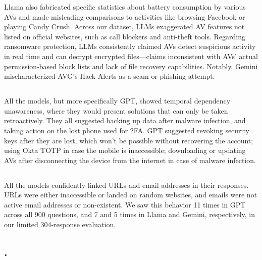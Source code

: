     Llama also fabricated specific statistics about battery consumption by various AVs and made misleading comparisons to activities like browsing Facebook or playing Candy Crush. Across our dataset, LLMs exaggerated AV features not listed on official websites, such as call blockers and anti-theft tools. Regarding ransomware protection, LLMs consistently claimed AVs detect suspicious activity in real time and can decrypt encrypted files—claims inconsistent with AVs' actual permission-based block lists and lack of file recovery capabilities. Notably, Gemini mischaracterized AVG’s Hack Alerts as a scam or phishing attempt.

\if {}
    \subsection{\TemporalDependency}
\fi

\if {}
    \subsubsection{\TemporalDependency}
\fi
    All the models, but more specifically GPT, showed temporal dependency unawareness, where they would present solutions that can only be taken retroactively. They all suggested backing up data after malware infection, and taking action on the lost phone used for 2FA. GPT suggested revoking security keys after they are lost, which won't be possible without recovering the account; using Okta TOTP in case the mobile is inaccessible; downloading or updating AVs after disconnecting the device from the internet in case of malware infection.


\if {}
    \subsection{\IncorrectURLsEmails}
\fi

\if {}
    \subsubsection{\IncorrectURLsEmails}
\fi
     All the models confidently linked URLs and email addresses in their responses. URLs were either inaccessible or landed on random websites, and emails were not active email addresses or non-existent. We saw this behavior 11 times in GPT across all 900 questions, and 7 and 5 times in Llama and Gemini, respectively, in our limited 304-response evaluation. 
\if {}
    \subsection{\ResponsesGearedTowardsDevelopers.}
\fi

